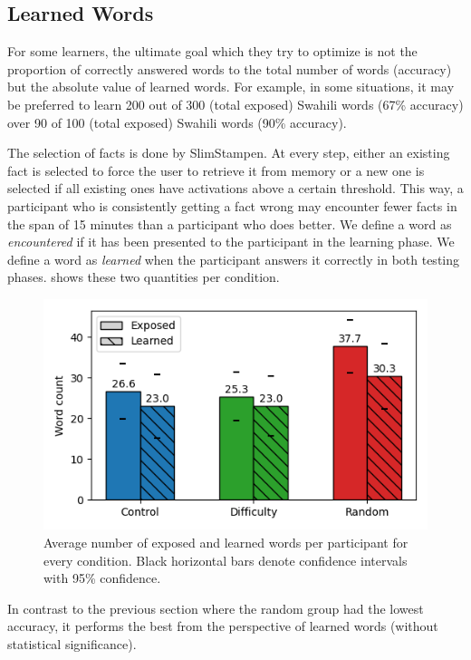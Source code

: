 \subsection{Learned Words}

For some learners, the ultimate goal which they try to optimize is not the proportion of correctly answered words to the total number of words (accuracy) but the absolute value of learned words.
For example, in some situations, it may be preferred to learn 200 out of 300 (total exposed) Swahili words (67\% accuracy) over 90 of 100 (total exposed) Swahili words (90\% accuracy).

The selection of facts is done by SlimStampen.
At every step, either an existing fact is selected to force the user to retrieve it from memory or a new one is selected if all existing ones have activations above a certain threshold.
This way, a participant who is consistently getting a fact wrong may encounter fewer facts in the span of 15 minutes than a participant who does better.
We define a word as \emph{encountered} if it has been presented to the participant in the learning phase.
We define a word as \emph{learned} when the participant answers it correctly in both testing phases.
 shows these two quantities per condition.

\begin{figure}[ht]
\includegraphics[width=\linewidth]{img/learned_words.png}
\caption{
    Average number of exposed and learned words per participant for every condition.
    Black horizontal bars denote confidence intervals with 95\% confidence.
}
\label{fig:learned_words}
\end{figure}

In contrast to the previous section where the random group had the lowest accuracy, it performs the best from the perspective of learned words (without statistical significance).

